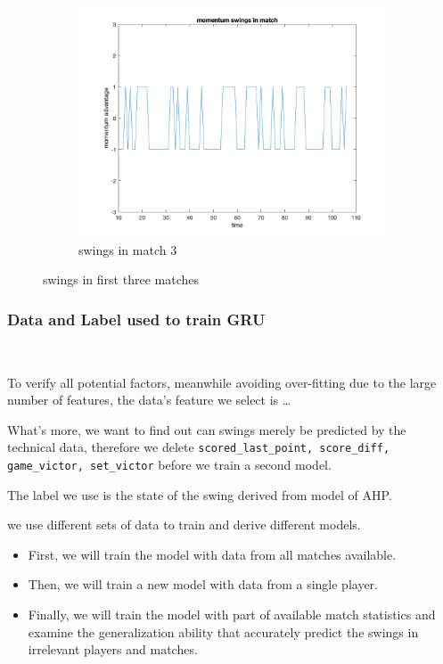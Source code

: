 \begin{figure}[H]
\begin{subfigure}[b]{0.34\textwidth}
        \includegraphics[width=\linewidth]{mainmatter/imgs/swing_match3.png}
        \caption{swings in match 3}
    \end{subfigure}
    \caption{swings in first three matches}
    \label{fig:swings in matches}
\end{figure}


\subsubsection{Data and Label used to train GRU}~{}

To verify all potential factors, meanwhile avoiding over-fitting due to the large number of features,
the data's feature we select is \dots

What's more, we want to find out can swings merely be predicted by the technical data,
therefore we delete \verb|scored_last_point, score_diff, game_victor, set_victor| before we train a second model.

The label we use is the state of the swing derived from model of AHP.

we use different sets of data to train and derive different models.

\begin{itemize}
    \item First, we will train the model with data from all matches available.
    \item Then, we will train a new model with data from a single player.
    \item Finally, we will train the model with part of available match statistics and examine
    the generalization ability that accurately predict the swings in irrelevant players and matches.
\end{itemize}





